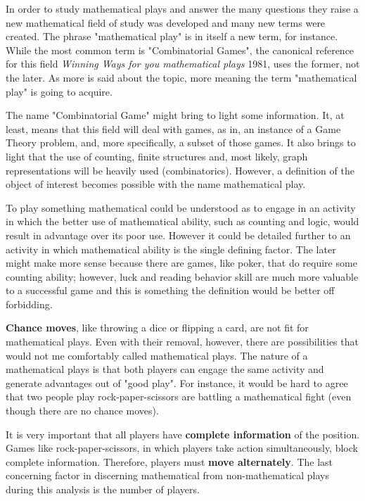 
In order to study mathematical plays and answer the many questions they raise a new mathematical field of study was developed and many new terms were created. The phrase "mathematical play" is in itself a new term, for instance. While the most common term is "Combinatorial Games", the canonical reference for this field \textit{Winning Ways for you mathematical plays} 1981, uses the former, not the later. As more is said about the topic, more meaning the term "mathematical play" is going to acquire.

The name "Combinatorial Game" might bring to light some information. It, at least, means that this field will deal with games, as in, an instance of a Game Theory problem, and, more specifically, a subset of those games. It also brings to light that the use of counting, finite structures and, most likely, graph representations will be heavily used (combinatorics). However, a definition of the object of interest becomes possible with the name mathematical play.

To play something mathematical could be understood as to engage in an activity in which the better use of mathematical ability, such as counting and logic, would result in advantage over its poor use. However it could be detailed further to an activity in which mathematical ability is the single defining factor. The later might make more sense because there are games, like poker, that do require some counting ability; however, luck and reading behavior skill are much more valuable to a successful game and this is something the definition would be better off forbidding.

\textbf{Chance moves}, like throwing a dice or flipping a card, are not fit for mathematical plays. Even with their removal, however, there are possibilities that would not me comfortably called mathematical plays. The nature of a mathematical plays is that both players can engage the same activity and generate advantages out of "good play". For instance, it would be hard to agree that two people play rock-paper-scissors are battling a mathematical fight (even though there are no chance moves).

It is very important that all players have \textbf{complete information} of the position. Games like rock-paper-scissors, in which players take action simultaneously, block complete information. Therefore, players must \textbf{move alternately}. The last concerning factor in discerning mathematical from non-mathematical plays during this analysis is the number of players.


